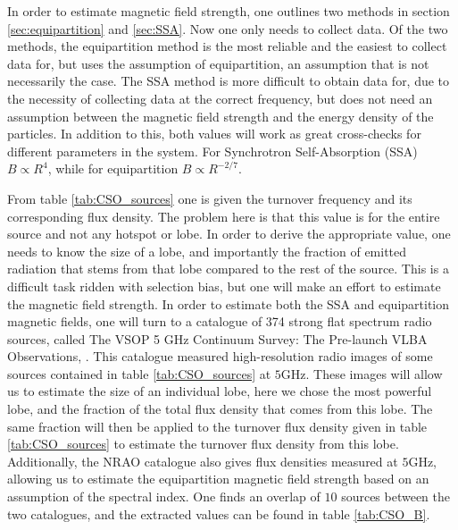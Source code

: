 In order to estimate magnetic field strength, one outlines two methods in section \ref{sec:equipartition} and \ref{sec:SSA}. Now one only needs to collect data. Of the two methods, the equipartition method is the most reliable and the easiest to collect data for, but uses the assumption of equipartition, an assumption that is not necessarily the case. The SSA method is more difficult to obtain data for, due to the necessity of collecting data at the correct frequency, but does not need an assumption between the magnetic field strength and the energy density of the particles. In addition to this, both values will work as great cross-checks for different parameters in the system. For Synchrotron Self-Absorption (SSA) $B \propto R^{4}$, while for equipartition $B \propto R^{-2/7}$.

From table \ref{tab:CSO_sources} one is given the turnover frequency and its corresponding flux density. The problem here is that this value is for the entire source and not any hotspot or lobe. In order to derive the appropriate value, one needs to know the size of a lobe, and importantly the fraction of emitted radiation that stems from that lobe compared to the rest of the source. This is a difficult task ridden with selection bias, but one will make an effort to estimate the magnetic field strength. In order to estimate both the SSA and equipartition magnetic fields, one will turn to a catalogue of 374 strong flat spectrum radio sources, called The VSOP 5 GHz Continuum Survey: The Pre-launch VLBA Observations, \cite{nrao1996}. This catalogue measured high-resolution radio images of some sources contained in table \ref*{tab:CSO_sources} at $5$GHz. These images will allow us to estimate the size of an individual lobe, here we chose the most powerful lobe, and the fraction of the total flux density that comes from this lobe. The same fraction will then be applied to the turnover flux density given in table \ref{tab:CSO_sources} to estimate the turnover flux density from this lobe. Additionally, the NRAO catalogue also gives flux densities measured at $5$GHz, allowing us to estimate the equipartition magnetic field strength based on an assumption of the spectral index. One finds an overlap of $10$ sources between the two catalogues, and the extracted values can be found in table \ref{tab:CSO_B}.


